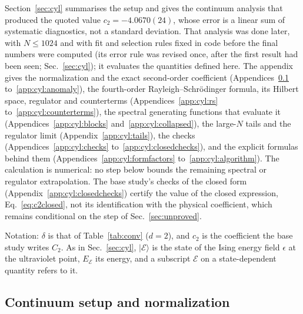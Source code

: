 \documentclass[11pt,a4paper]{article}
\numberwithin{equation}{section}
\newcommand{\ket}[1]{\lvert#1\rangle}
\begin{document}
Section~\ref{sec:cyl} summarises the setup and gives the continuum analysis that produced the quoted value
$c_2=-4.0670(24)$, whose error is a linear sum of systematic diagnostics, not a standard deviation. That analysis was
done later, with $N\le1024$ and with fit and selection rules fixed in code before the final numbers were computed
(its error rule was revised once, after the first result had been seen; Sec.~\ref{sec:cyl}); it evaluates the
quantities defined here. The appendix gives
the normalization and the exact second-order coefficient (Appendices~\ref{app:cyl:setup} to~\ref{app:cyl:anomaly}), the
fourth-order Rayleigh--Schr\"odinger formula, its Hilbert space, regulator and counterterms
(Appendices~\ref{app:cyl:rs} to~\ref{app:cyl:counterterms}), the spectral generating functions that evaluate it
(Appendices~\ref{app:cyl:blocks} and~\ref{app:cyl:collapsed}), the large-$N$ tails and the regulator limit
(Appendix~\ref{app:cyl:tails}), the checks (Appendices~\ref{app:cyl:checks} to~\ref{app:cyl:closedchecks}), and the explicit
formulas behind them (Appendices~\ref{app:cyl:formfactors} to~\ref{app:cyl:algorithm}). The calculation is numerical: no
step below bounds the remaining spectral or regulator extrapolation. The base study's checks of the closed form
(Appendix~\ref{app:cyl:closedchecks}) certify the value of the closed expression, Eq.~\eqref{eq:c2closed}, not its
identification with the physical coefficient, which remains conditional on the step of Sec.~\ref{sec:unproved}.

Notation: $\delta$ is that of Table~\ref{tab:conv} ($d=2$), and $c_2$ is the coefficient the base study writes $C_2$.
As in Sec.~\ref{sec:cyl}, $\ket{\mathcal E}$ is the state of the Ising energy field $\epsilon$ at the ultraviolet
point, $E_{\mathcal E}$ its energy, and a subscript $\mathcal E$ on a state-dependent quantity refers to it.

\subsection{Continuum setup and normalization}\label{app:cyl:setup}
\end{document}
